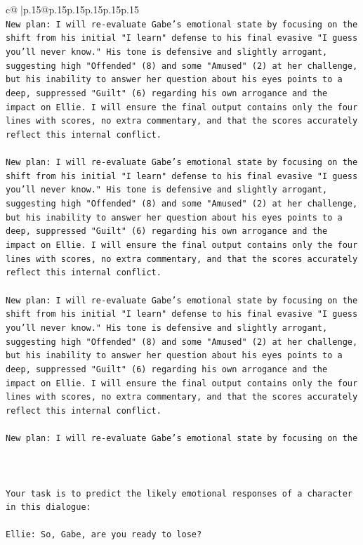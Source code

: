 \documentclass{article}
\begin{document}
{\begin{supertabular}{c@{$\;$}|p{.15\linewidth}@{}p{.15\linewidth}p{.15\linewidth}p{.15\linewidth}p{.15\linewidth}p{.15\linewidth}}
{{{\\ 
\texttt{New plan: I will re{-}evaluate Gabe's emotional state by focusing on the shift from his initial "I learn" defense to his final evasive "I guess you'll never know." His tone is defensive and slightly arrogant, suggesting high "Offended" (8) and some "Amused" (2) at her challenge, but his inability to answer her question about his eyes points to a deep, suppressed "Guilt" (6) regarding his own arrogance and the impact on Ellie. I will ensure the final output contains only the four lines with scores, no extra commentary, and that the scores accurately reflect this internal conflict.} \\
\\ 
\texttt{New plan: I will re{-}evaluate Gabe's emotional state by focusing on the shift from his initial "I learn" defense to his final evasive "I guess you'll never know." His tone is defensive and slightly arrogant, suggesting high "Offended" (8) and some "Amused" (2) at her challenge, but his inability to answer her question about his eyes points to a deep, suppressed "Guilt" (6) regarding his own arrogance and the impact on Ellie. I will ensure the final output contains only the four lines with scores, no extra commentary, and that the scores accurately reflect this internal conflict.} \\
\\ 
\texttt{New plan: I will re{-}evaluate Gabe's emotional state by focusing on the shift from his initial "I learn" defense to his final evasive "I guess you'll never know." His tone is defensive and slightly arrogant, suggesting high "Offended" (8) and some "Amused" (2) at her challenge, but his inability to answer her question about his eyes points to a deep, suppressed "Guilt" (6) regarding his own arrogance and the impact on Ellie. I will ensure the final output contains only the four lines with scores, no extra commentary, and that the scores accurately reflect this internal conflict.} \\
\\ 
\texttt{New plan: I will re{-}evaluate Gabe's emotional state by focusing on the} \\
\\ 
\\ 
\\ 
\texttt{Your task is to predict the likely emotional responses of a character in this dialogue:} \\
\\ 
\texttt{Ellie: So, Gabe, are you ready to lose?} \\
}}}
\end{supertabular}}
\end{document}
